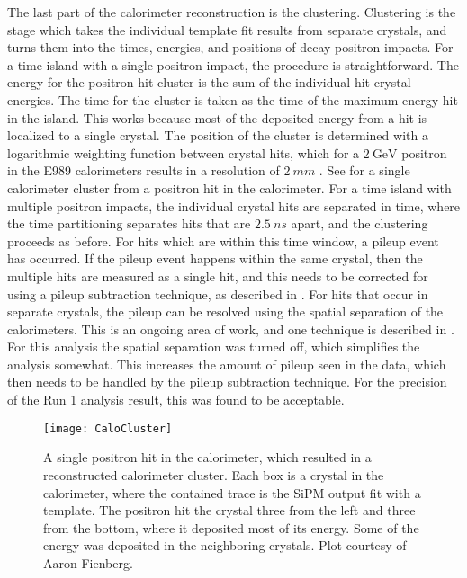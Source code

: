 The last part of the calorimeter reconstruction is the clustering. Clustering is the stage which takes the individual template fit results from separate crystals, and turns them into the times, energies, and positions of decay positron impacts. For a time island with a single positron impact, the procedure is straightforward. The energy for the positron hit cluster is the sum of the individual hit crystal energies. The time for the cluster is taken as the time of the maximum energy hit in the island. This works because most of the deposited energy from a hit is localized to a single crystal. The position of the cluster is determined with a logarithmic weighting function between crystal hits, which for a $\SI{2}{\GeV}$ positron in the E989 calorimeters results in a resolution of $\SI{2}{mm}$ \cite{AFThesis}. See  for a single calorimeter cluster from a positron hit in the calorimeter. For a time island with multiple positron impacts, the individual crystal hits are separated in time, where the time partitioning separates hits that are $\SI{2.5}{ns}$ apart, and the clustering proceeds as before. For hits which are within this time window, a pileup event has occurred. If the pileup event happens within the same crystal, then the multiple hits are measured as a single hit, and this needs to be corrected for using a pileup subtraction technique, as described in . For hits that occur in separate crystals, the pileup can be resolved using the spatial separation of the calorimeters. This is an ongoing area of work, and one technique is described in . For this analysis the spatial separation was turned off, which simplifies the analysis somewhat. This increases the amount of pileup seen in the data, which then needs to be handled by the pileup subtraction technique. For the precision of the Run 1 analysis result, this was found to be acceptable. 


\begin{figure}[]
    \centering
    \texttt{[image: CaloCluster]}
    \caption[Calorimeter cluster from SiPM traces fit with templates]{A single positron hit in the calorimeter, which resulted in a reconstructed calorimeter cluster. Each box is a crystal in the calorimeter, where the contained trace is the SiPM output fit with a template. The positron hit the crystal three from the left and three from the bottom, where it deposited most of its energy. Some of the energy was deposited in the neighboring crystals. Plot courtesy of Aaron Fienberg.}
    \label{fig:CaloCluster}
\end{figure}



